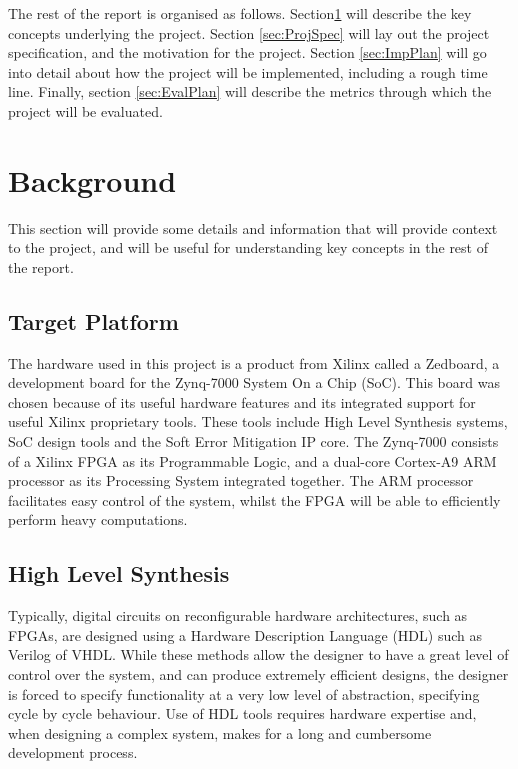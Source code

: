 \documentclass[12pt]{article}
\begin{document}
The rest of the report is organised as follows. Section\ref{sec:Background} will describe the key concepts underlying the project. Section \ref{sec:ProjSpec} will lay out the project specification, and the motivation for the project. Section \ref{sec:ImpPlan} will go into detail about how the project will be implemented, including a rough time line. Finally, section \ref{sec:EvalPlan} will describe the metrics through which the project will be evaluated.

\section{Background}
\label{sec:Background}
\vspace{-12pt}

This section will provide some details and information that will provide context to the project, and will be useful for understanding key concepts in the rest of the report.

\subsection{Target Platform}
\label{sec:Background-TargetPlatform}
\vspace{-12pt}

The hardware used in this project is a product from Xilinx called a Zedboard, a development board for the Zynq-7000 System On a Chip (SoC). This board was chosen because of its useful hardware features and its integrated support for useful Xilinx proprietary tools. These tools include High Level Synthesis systems, SoC design tools and the Soft Error Mitigation IP core. The Zynq-7000 consists of a Xilinx FPGA as its Programmable Logic, and a dual-core Cortex-A9 ARM processor as its Processing System integrated together. The ARM processor facilitates easy control of the system, whilst the FPGA will be able to efficiently perform heavy computations.


\subsection{High Level Synthesis}
\label{sec:Background-HLS}
\vspace{-12pt}

Typically, digital circuits on reconfigurable hardware architectures, such as FPGAs, are designed using a Hardware Description Language (HDL) such as Verilog of VHDL. While these methods allow the designer to have a great level of control over the system, and can produce extremely efficient designs, the designer is forced to specify functionality at a very low level of abstraction, specifying cycle by cycle behaviour. Use of HDL tools requires hardware expertise and, when designing a complex system, makes for a long and cumbersome development process.
\end{document}
